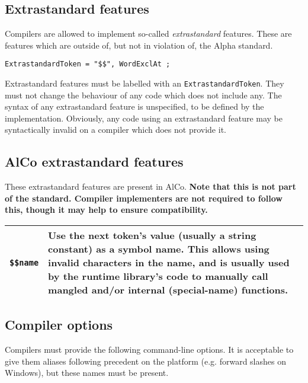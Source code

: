 \documentclass{article}
\begin{document}
\subsection{Extrastandard features}
\label{sub:implementation:extrastandard}
Compilers are allowed to implement so-called {\it extrastandard} features. These
are features which are outside of, but not in violation of, the Alpha standard.

\begin{verbatim}
ExtrastandardToken = "$$", WordExclAt ;
\end{verbatim}

Extrastandard features must be labelled with an \texttt{ExtrastandardToken}.
They must not change the behaviour of any code which does not include any.
The syntax of any extrastandard feature is unspecified, to be defined by the
implementation. Obviously, any code using an extrastandard feature may be
syntactically invalid on a compiler which does not provide it.

\subsection{AlCo extrastandard features}
\label{sub:implementation:alcoextra}
These extrastandard features are present in AlCo. \textbf{Note that this is not
part of the standard. Compiler implementers are not required to follow this,
though it may help to ensure compatibility.}

\begin{center}
\begin{tabular}{|l|p{4in}|}
\hline
\texttt{\$\$name} & Use the next token's value (usually a string constant) as
  a symbol name. This allows using invalid characters in the name, and is
  usually used by the runtime library's code to manually call mangled and/or
  internal (special-name) functions. \\
\hline
\end{tabular}
\end{center}

\subsection{Compiler options}
\label{sub:implementation:options}
Compilers must provide the following command-line options. It is acceptable to
give them aliases following precedent on the platform (e.g. forward slashes
on Windows), but these names must be present.
\end{document}
